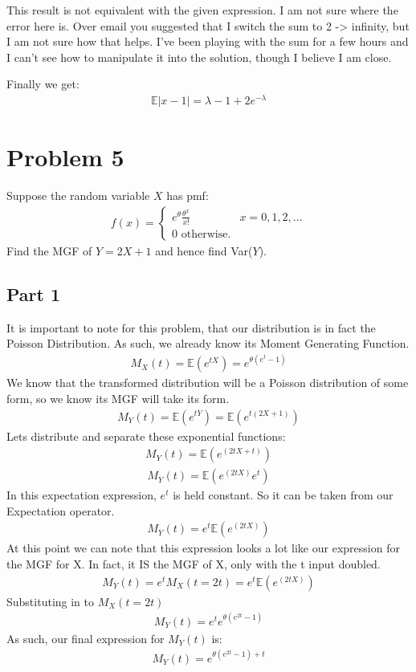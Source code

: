\documentclass{article}
\begin{document}
This result is not equivalent with the given expression. I am not sure where the error here is. Over email you suggested that I switch the sum to 2 -> infinity, but I am not sure how that helps.
I've been playing with the sum for a few hours and I can't see how to manipulate it into the solution, though I believe I am close.

Finally we get:
\begin{align*}
\boxed{ \mathbb{E}|x-1| = \lambda - 1+2e^{-\lambda} }
\end{align*}
\clearpage

\section*{Problem 5}
Suppose the random variable $X$ has pmf:
\begin{align*}
f(x) = \begin{cases} e^{\theta} \frac{\theta^x}{x!} & x=0,1,2,... \\
                     0 \text{ otherwise.}
                     \end{cases}
\end{align*}
Find the MGF of $Y=2X+1$ and hence find Var($Y$).
\subsection*{Part 1}
It is important to note for this problem, that our distribution is in fact the Poisson Distribution. As such, we already know its Moment Generating Function.
\begin{align*}
M_X(t) = \mathbb{E}(e^{tX}) = e^{\theta(e^t-1)}
\end{align*}
We know that the transformed distribution will be a Poisson distribution of some form, so we know its MGF will take its form.
\begin{align*}
M_Y(t) = \mathbb{E}(e^{tY}) = \mathbb{E}(e^{t(2X+1)})
\end{align*}
Lets distribute and separate these exponential functions:
\begin{align*}
M_Y(t) = \mathbb{E}(e^{(2tX+t)})
\end{align*}
\begin{align*}
M_Y(t) = \mathbb{E}(e^{(2tX)} e^t)
\end{align*}
In this expectation expression, $e^t$ is held constant. So it can be taken from our Expectation operator.
\begin{align*}
M_Y(t) =  e^t \mathbb{E}(e^{(2tX)})
\end{align*}
At this point we can note that this expression looks a lot like our expression for the MGF for X. In fact, it IS the MGF of X, only with the t input doubled.
\begin{align*}
M_Y(t) = e^t M_X(t=2t) = e^t \mathbb{E}(e^{(2tX)})
\end{align*}
Substituting in to $M_X(t=2t)$
\begin{align*}
M_Y(t) = e^t e^{\theta(e^{2t}-1)}
\end{align*}
As such, our final expression for $M_Y(t)$ is:
\begin{align*}
\boxed{ M_Y(t) = e^{\theta(e^{2t}-1)+t} } 
\end{align*}
\clearpage
\end{document}
